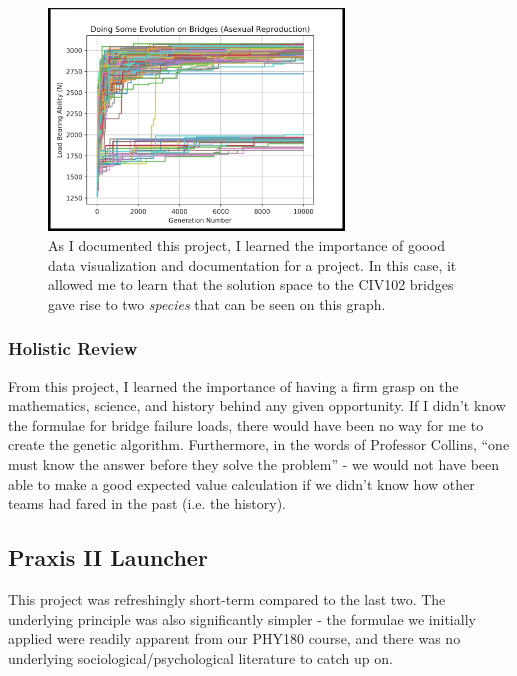 \documentclass[a4paper,12pt]{article}
\begin{document}
\begin{figure}[H]
\centering
\includegraphics[width=0.7\textwidth]{img/image006.png}
\caption{As I documented this project, I learned the importance of goood data visualization and documentation for a project. In this case, it allowed me to learn that the solution space to the CIV102 bridges gave rise to two \textit{species} that can be seen on this graph.}
\label{}
\end{figure}

\subsubsection{Holistic Review}
From this project, I learned the importance of having a firm grasp on the {mathematics, science, and history} behind any given opportunity. If I didn’t know the formulae for bridge failure loads, there would have been no way for me to create the genetic algorithm. Furthermore, in the words of Professor Collins, “one must know the answer before they solve the problem” - we would not have been able to make a good expected value calculation if we didn’t know how other teams had fared in the past (i.e. the history).

\subsection{Praxis II Launcher}
\label{sec:launch}
This project was refreshingly short-term compared to the last two. The underlying principle was also significantly simpler - the formulae we initially applied were readily apparent from our PHY180 course, and there was no underlying sociological/psychological literature to catch up on.
\end{document}
